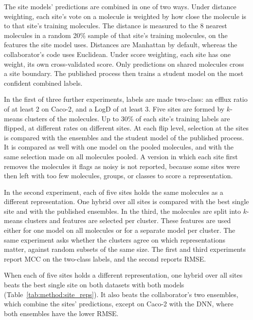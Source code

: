 The site models' predictions are combined in one of two ways. Under distance weighting, each site's vote on a molecule is weighted by how close the molecule is to that site's training molecules. The distance is measured to the 8 nearest molecules in a random 20\% sample of that site's training molecules, on the features the site model uses. Distances are Manhattan by default, whereas the collaborator's code uses Euclidean. Under score weighting, each site has one weight, its own cross-validated score. Only predictions on shared molecules cross a site boundary. The published process then trains a student model on the most confident combined labels.

In the first of three further experiments, labels are made two-class: an efflux ratio of at least 2 on Caco-2, and a LogD of at least 3. Five sites are formed by $k$-means clusters of the molecules. Up to 30\% of each site's training labels are flipped, at different rates on different sites. At each flip level, selection at the sites is compared with the ensembles and the student model of the published process. It is compared as well with one model on the pooled molecules, and with the same selection made on all molecules pooled. A version in which each site first removes the molecules it flags as noisy is not reported, because some sites were then left with too few molecules, groups, or classes to score a representation.

In the second experiment, each of five sites holds the same molecules as a different representation. One hybrid over all sites is compared with the best single site and with the published ensembles. In the third, the molecules are split into $k$-means clusters and features are selected per cluster. These features are used either for one model on all molecules or for a separate model per cluster. The same experiment asks whether the clusters agree on which representations matter, against random subsets of the same size. The first and third experiments report MCC on the two-class labels, and the second reports RMSE.

When each of five sites holds a different representation, one hybrid over all sites beats the best single site on both datasets with both models (Table~\ref{tab:method:site_reps}). It also beats the collaborator's two ensembles, which combine the sites' predictions, except on Caco-2 with the DNN, where both ensembles have the lower RMSE.

